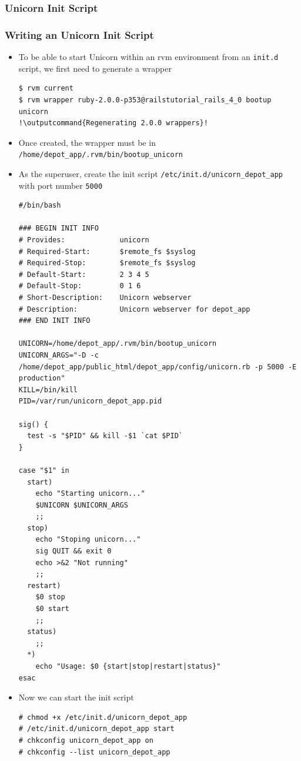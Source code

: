 \documentclass{beamer}
\newcommand{\outputcommand}[1]{\color{darkgreen}{#1}}
\begin{document}
\subsubsection{Unicorn Init Script}
\begin{frame}
\frametitle{Writing an Unicorn Init Script}
\begin{itemize}

\item To be able to start Unicorn within an \acrshort{rvm} environment from an \texttt{init.d} script, we first need to generate a wrapper

\lstset{language=shell, escapechar=!}
\begin{lstlisting}[escapechar=!]
$ rvm current
$ rvm wrapper ruby-2.0.0-p353@railstutorial_rails_4_0 bootup unicorn
!\outputcommand{Regenerating 2.0.0 wrappers}!
\end{lstlisting}
\item Once created, the wrapper must be in \texttt{/home/depot\_app/.rvm/bin/bootup\_unicorn}

\item As the superuser, create the init script \texttt{/etc/init.d/unicorn\_depot\_app} with port number \texttt{\alert{5000}}
\lstset{language=shell, numbers=left}
\begin{lstlisting}[escapechar=!]
#/bin/bash

### BEGIN INIT INFO
# Provides:             unicorn
# Required-Start:       $remote_fs $syslog
# Required-Stop:        $remote_fs $syslog
# Default-Start:        2 3 4 5
# Default-Stop:         0 1 6
# Short-Description:    Unicorn webserver
# Description:          Unicorn webserver for depot_app
### END INIT INFO

UNICORN=/home/depot_app/.rvm/bin/bootup_unicorn
UNICORN_ARGS="-D -c /home/depot_app/public_html/depot_app/config/unicorn.rb -p 5000 -E production"
KILL=/bin/kill
PID=/var/run/unicorn_depot_app.pid

sig() {
  test -s "$PID" && kill -$1 `cat $PID`
}

case "$1" in
  start)
    echo "Starting unicorn..."
    $UNICORN $UNICORN_ARGS
    ;;
  stop)
    echo "Stoping unicorn..."
    sig QUIT && exit 0
    echo >&2 "Not running"
    ;;
  restart)
    $0 stop
    $0 start
    ;;
  status)
    ;;
  *)
    echo "Usage: $0 {start|stop|restart|status}"
esac
\end{lstlisting}

\item Now we can start the init script
\lstset{language=shell, escapechar=!}
\begin{lstlisting}[escapechar=!]
# chmod +x /etc/init.d/unicorn_depot_app
# /etc/init.d/unicorn_depot_app start
# chkconfig unicorn_depot_app on
# chkconfig --list unicorn_depot_app
\end{lstlisting}


\end{itemize}
\end{frame}
\end{document}
